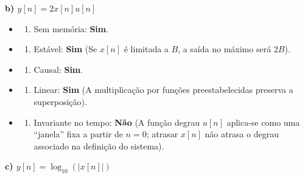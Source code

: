\textbf{b) \(y[n] = 2x[n]u[n]\)}

\begin{itemize}
\tightlist
\item
  \begin{enumerate}
  \def\labelenumi{(\roman{enumi})}
  \tightlist
  \item
    Sem memória: \textbf{Sim}.
  \end{enumerate}
\item
  \begin{enumerate}
  \def\labelenumi{(\roman{enumi})}
  \setcounter{enumi}{1}
  \tightlist
  \item
    Estável: \textbf{Sim} (Se \(x[n]\) é limitada a \(B\), a saída no máximo será \(2B\)).
  \end{enumerate}
\item
  \begin{enumerate}
  \def\labelenumi{(\roman{enumi})}
  \setcounter{enumi}{2}
  \tightlist
  \item
    Causal: \textbf{Sim}.
  \end{enumerate}
\item
  \begin{enumerate}
  \def\labelenumi{(\roman{enumi})}
  \setcounter{enumi}{3}
  \tightlist
  \item
    Linear: \textbf{Sim} (A multiplicação por funções preestabelecidas preserva a superposição).
  \end{enumerate}
\item
  \begin{enumerate}
  \def\labelenumi{(\alph{enumi})}
  \setcounter{enumi}{21}
  \tightlist
  \item
    Invariante no tempo: \textbf{Não} (A função degrau \(u[n]\) aplica-se como uma ``janela'' fixa a partir de \(n=0\); atrasar \(x[n]\) não atrasa o degrau associado na definição do sistema).
  \end{enumerate}
\end{itemize}

\textbf{c) \(y[n] = \log_{10}(|x[n]|)\)}

